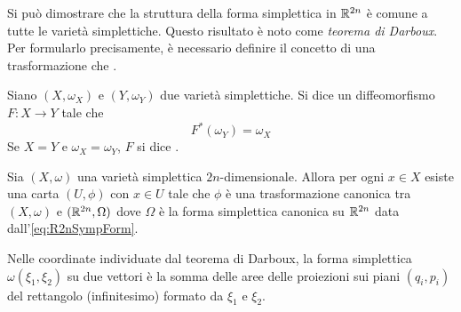 Si può dimostrare che la struttura della forma simplettica in $\mathbb{R}^{2n}$ è comune a tutte le varietà simplettiche. Questo risultato è noto come \emph{teorema di Darboux}. Per formularlo precisamente, è necessario definire il concetto di una trasformazione che .

\begin{definition}
  Siano $(X, \omega_X)$ e $(Y, \omega_Y)$ due varietà simplettiche. Si dice  un diffeomorfismo $F:X\to Y$ tale che 
  \begin{equation}
    F^*(\omega_Y) = \omega_X
  \end{equation} 
  Se $X = Y$ e $\omega_X = \omega_Y$, $F$ si dice .
\end{definition}

\begin{theorem}[Darboux]
  Sia $(X,\omega)$ una varietà simplettica $2n$-dimensionale. Allora per ogni $x \in X$ esiste una carta $(U,\phi)$ con $x \in U$ tale che $\phi$ è una trasformazione canonica tra $(X,\omega)$ e $(\mathbb{R}^{2n}, \Omega)$ dove $\Omega$ è la forma simplettica canonica su $\mathbb{R}^{2n}$ data dall'\autoref{eq:R2nSympForm}.
\end{theorem}
\begin{remark}
  Nelle coordinate individuate dal teorema di Darboux, la forma simplettica $\omega(\xi_1,\xi_2)$ su due vettori è la somma delle aree delle  proiezioni sui piani $(q_i, p_i)$ del rettangolo (infinitesimo) formato da $\xi_1$ e $\xi_2$.
\end{remark}

